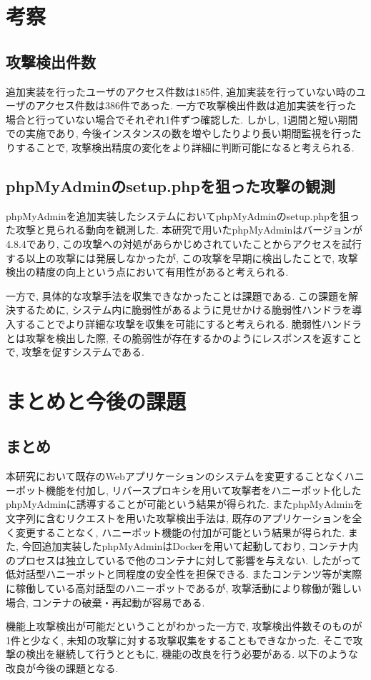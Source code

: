 \documentclass[submit,techrep,noauthor]{ipsj}
\begin{document}
\section{考察}

\subsection{攻撃検出件数}
追加実装を行ったユーザのアクセス件数は185件, 追加実装を行っていない時のユーザのアクセス件数は386件であった. 一方で攻撃検出件数は追加実装を行った場合と行っていない場合でそれぞれ1件ずつ確認した.
しかし, 1週間と短い期間での実施であり, 今後インスタンスの数を増やしたりより長い期間監視を行ったりすることで, 攻撃検出精度の変化をより詳細に判断可能になると考えられる.

\subsection{phpMyAdminのsetup.phpを狙った攻撃の観測}
phpMyAdminを追加実装したシステムにおいてphpMyAdminのsetup.phpを狙った攻撃と見られる動向を観測した. 本研究で用いたphpMyAdminはバージョンが4.8.4であり, この攻撃への対処があらかじめされていたことからアクセスを試行する以上の攻撃には発展しなかったが, この攻撃を早期に検出したことで, 攻撃検出の精度の向上という点において有用性があると考えられる.\par
一方で, 具体的な攻撃手法を収集できなかったことは課題である. この課題を解決するために, システム内に脆弱性があるように見せかける脆弱性ハンドラを導入することでより詳細な攻撃を収集を可能にすると考えられる. 脆弱性ハンドラとは攻撃を検出した際, その脆弱性が存在するかのようにレスポンスを返すことで, 攻撃を促すシステムである.

\section{まとめと今後の課題}

\subsection{まとめ}
本研究において既存のWebアプリケーションのシステムを変更することなくハニーポット機能を付加し, リバースプロキシを用いて攻撃者をハニーポット化したphpMyAdminに誘導することが可能という結果が得られた. またphpMyAdminを文字列に含むリクエストを用いた攻撃検出手法は, 既存のアプリケーションを全く変更することなく, ハニーポット機能の付加が可能という結果が得られた. また, 今回追加実装したphpMyAdminはDockerを用いて起動しており, コンテナ内のプロセスは独立しているで他のコンテナに対して影響を与えない. したがって低対話型ハニーポットと同程度の安全性を担保できる.
またコンテンツ等が実際に稼働している高対話型のハニーポットであるが, 攻撃活動により稼働が難しい場合, コンテナの破棄・再起動が容易である.\par
機能上攻撃検出が可能だということがわかった一方で, 攻撃検出件数そのものが1件と少なく, 未知の攻撃に対する攻撃収集をすることもできなかった. そこで攻撃の検出を継続して行うとともに, 機能の改良を行う必要がある. 以下のような改良が今後の課題となる.
\end{document}
